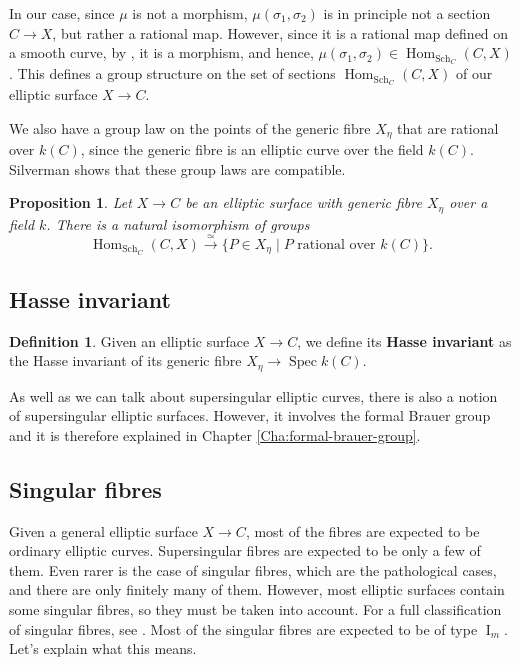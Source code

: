 \documentclass{report}
\DeclareMathOperator{\Spec}{Spec}
\DeclareMathOperator{\Hom}{Hom}
\DeclareMathOperator{\I}{I}
\DeclareMathOperator{\Sch}{Sch}
\newtheorem{proposition}[theorem]{Proposition}
\theoremstyle{definition}
\newtheorem{definition}[theorem]{Definition}
\begin{document}
In our case, since $\mu$ is not a morphism, $\mu(\sigma_1,\sigma_2)$ is in principle not a section $C\rightarrow X$, but rather a rational map. However, since it is a rational map defined on a smooth curve, by \cite[Proposition~II.2.1]{silverman2009arithmetic}, it is a morphism, and hence, $\mu(\sigma_1,\sigma_2)\in\Hom_{\Sch_C}(C,X)$. This defines a group structure on the set of sections $\Hom_{\Sch_C}(C,X)$ of our elliptic surface $X\rightarrow C$.

We also have a group law on the points of the generic fibre $X_{\eta}$ that are rational over $k(C)$, since the generic fibre is an elliptic curve over the field $k(C)$. Silverman \cite[Proposition~3.10]{silverman1994advanced} shows that these group laws are compatible.

\begin{proposition}
Let $X\rightarrow C$ be an elliptic surface with generic fibre $X_{\eta}$ over a field $k$. There is a natural isomorphism of groups
\[\Hom_{\Sch_C}(C,X)\overset{\simeq}{\longrightarrow}\{P\in X_{\eta}\mid P\text{ rational over }k(C)\}.\]
\end{proposition}

\subsection{Hasse invariant}

\begin{definition}
Given an elliptic surface $X\rightarrow C$, we define its \textbf{Hasse invariant} as the Hasse invariant of its generic fibre $X_{\eta}\rightarrow\Spec k(C)$.
\end{definition}

As well as we can talk about supersingular elliptic curves, there is also a notion of supersingular elliptic surfaces. However, it involves the formal Brauer group and it is therefore explained in Chapter \ref{Cha:formal-brauer-group}.

\subsection{Singular fibres}

Given a general elliptic surface $X\rightarrow C$, most of the fibres are expected to be ordinary elliptic curves. Supersingular fibres are expected to be only a few of them. Even rarer is the case of singular fibres, which are the pathological cases, and there are only finitely many of them. However, most elliptic surfaces contain some singular fibres, so they must be taken into account. For a full classification of singular fibres, see \cite[Section~5.4]{schuett2019mordell}. Most of the singular fibres are expected to be of type $\I_m$. Let's explain what this means.
\end{document}
